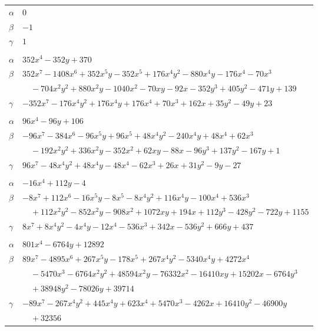 \documentclass[11pt]{article}
\begin{document}
\begin{longtable}{@{}ll@{}}
$\alpha$ & $0$\\
$\beta$ & $-1$\\
$\gamma$ & $1$\\
\addlinespace[3pt]
\multicolumn{2}{@{}l}{$\{i,j\}=\{19,79\}$, $k_{ij}=2^{2}\cdot 3^{4}$}\\
$\alpha$ & $352x^{4}-352y+370$\\
$\beta$ & $352x^{7}-1408x^{6}+352x^{5}y-352x^{5}+176x^{4}y^{2}-880x^{4}y-176x^{4}-70x^{3}$\\
 & $\quad -704x^{2}y^{2}+880x^{2}y-1040x^{2}-70xy-92x-352y^{3}+405y^{2}-471y+139$\\
$\gamma$ & $-352x^{7}-176x^{4}y^{2}+176x^{4}y+176x^{4}+70x^{3}+162x+35y^{2}-49y+23$\\
\addlinespace[3pt]
\multicolumn{2}{@{}l}{$\{i,j\}=\{19,81\}$, $k_{ij}=2^{5}\cdot 5$}\\
$\alpha$ & $96x^{4}-96y+106$\\
$\beta$ & $-96x^{7}-384x^{6}-96x^{5}y+96x^{5}+48x^{4}y^{2}-240x^{4}y+48x^{4}+62x^{3}$\\
 & $\quad -192x^{2}y^{2}+336x^{2}y-352x^{2}+62xy-88x-96y^{3}+137y^{2}-167y+1$\\
$\gamma$ & $96x^{7}-48x^{4}y^{2}+48x^{4}y-48x^{4}-62x^{3}+26x+31y^{2}-9y-27$\\
\addlinespace[3pt]
\multicolumn{2}{@{}l}{$\{i,j\}=\{20,68\}$, $k_{ij}=3^{4}\cdot 5^{2}$}\\
$\alpha$ & $-16x^{4}+112y-4$\\
$\beta$ & $-8x^{7}+112x^{6}-16x^{5}y-8x^{5}-8x^{4}y^{2}+116x^{4}y-100x^{4}+536x^{3}$\\
 & $\quad +112x^{2}y^{2}-852x^{2}y-908x^{2}+1072xy+194x+112y^{3}-428y^{2}-722y+1155$\\
$\gamma$ & $8x^{7}+8x^{4}y^{2}-4x^{4}y-12x^{4}-536x^{3}+342x-536y^{2}+666y+437$\\
\addlinespace[3pt]
\multicolumn{2}{@{}l}{$\{i,j\}=\{20,87\}$, $k_{ij}=2\cdot 3^{4}\cdot 5^{3}$}\\
$\alpha$ & $801x^{4}-6764y+12892$\\
$\beta$ & $89x^{7}-4895x^{6}+267x^{5}y-178x^{5}+267x^{4}y^{2}-5340x^{4}y+4272x^{4}$\\
 & $\quad -5470x^{3}-6764x^{2}y^{2}+48594x^{2}y-76332x^{2}-16410xy+15202x-6764y^{3}$\\
 & $\quad +38948y^{2}-78026y+39714$\\
$\gamma$ & $-89x^{7}-267x^{4}y^{2}+445x^{4}y+623x^{4}+5470x^{3}-4262x+16410y^{2}-46900y$\\
 & $\quad +32356$\\

\end{longtable}
\end{document}
